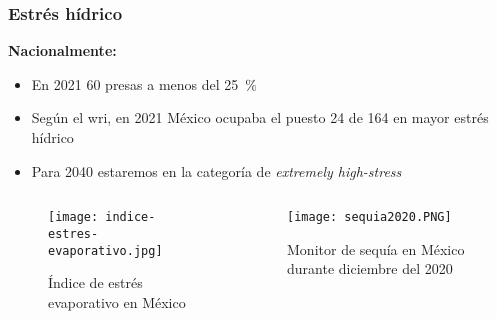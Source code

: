 
\begin{frame}
	\frametitle{Estrés hídrico}
	
	\textbf{Nacionalmente:}
			
	\begin{itemize}
		\item En 2021 60 presas a menos del \qty{25}{\percent} \cite{national_aeronautics_and_space_administration_sequigeneralizada_2021} 
		\item Según el \acrshort{wri}, en 2021 México ocupaba el puesto 24 de 164 en mayor estrés hídrico
		\item Para 2040 estaremos en la categoría de \textit{extremely high-stress} \cite{maddocks_ranking_2015}
	\end{itemize}

		\begin{columns}
		\begin{column}{0.5\textwidth}
			\centering
			\begin{figure}
				\centering
				\texttt{[image: indice-estres-evaporativo.jpg]}
				\caption{Índice de estrés evaporativo en México}
			\end{figure}
		\end{column}
		\begin{column}{0.5\textwidth}
			\centering
			\begin{figure}
				\centering
				\texttt{[image: sequia2020.PNG]}
				\caption{Monitor de sequía en México durante diciembre del 2020}
			\end{figure}
		\end{column}
	\end{columns}
\end{frame}